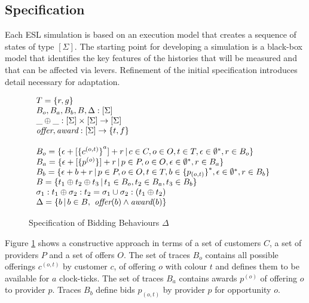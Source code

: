 \documentclass[10pt,numbers]{sigplanconf}
\def\bar{\mathop{|}}
\begin{document}
\subsection{Specification}

\label{sec:specification}

Each ESL simulation is based on an execution model that creates a sequence of states of type $[\Sigma]$. The starting point for developing a simulation is a black-box model that identifies the key features of the histories that will be measured and that can be affected via levers. Refinement of the initial specification introduces detail necessary for adaptation.

\begin{figure}
{\footnotesize
\[\begin{array}{@{}l}
T=\{r,g\}\\
B_o,B_a,B_b,B,\Delta:[\Sigma]\\
\_\oplus\_:[\Sigma]\times[\Sigma]\rightarrow[\Sigma]\\
\text{\it offer},\text{\it award}:[\Sigma]\rightarrow\{t,f\}\\\\
B_o=\{\epsilon+[{\{c^{(o,t)}\}}^a]+r\bar c\in C,o\in O,t\in T,\epsilon\in\emptyset^{*},r\in B_o\}\\
B_a=\{\epsilon+[\{p^{(o)}\}]+r\bar p\in P,o\in O,\epsilon\in\emptyset^{*},r\in B_a\}\\
B_b=\{\epsilon+b+r\bar p\in P,o\in O,t\in T,b\in{\{p_{(o,t)}\}
}^{*},\epsilon\in\emptyset^{*},r\in B_b \} \\
 B = \{ t_1\oplus t_2\oplus t_3\bar t_1\in B_o,t_2\in B_a,t_3\in B_b \}\\
\sigma_1:t_1\oplus\sigma_2:t_2 = \sigma_1\cup\sigma_2:(t_1\oplus t_2)\\
\Delta=\{b\bar b\in B, \text{\it offer}(b)\wedge\text{\it award}(b)\}
\end{array}\]}
\caption{Specification of Bidding Behaviours $\Delta$}
\label{fig:bidding}
\end{figure}

Figure \ref{fig:bidding} shows a constructive approach in terms of a set of customers $C$, a set of providers $P$ and a set of offers $O$. The set of traces $B_o$ contains all possible offerings $c^{(o,t)}$ by customer $c$, of offering $o$ with colour $t$ and defines them to be available for $a$ clock-ticks. The set of traces $B_a$ contains awards $p^{(o)}$ of offering $o$ to provider $p$. Traces $B_b$ define bids $p_{(o,t)}$ by provider $p$ for opportunity $o$. 
\end{document}
